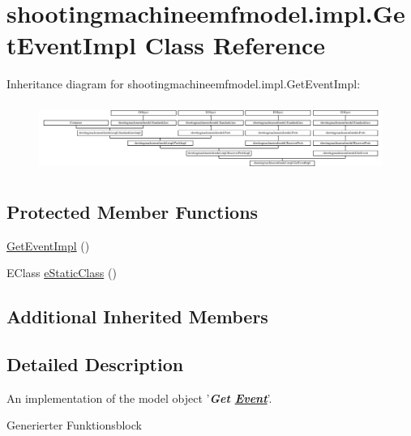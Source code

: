 \hypertarget{classshootingmachineemfmodel_1_1impl_1_1_get_event_impl}{\section{shootingmachineemfmodel.\-impl.\-Get\-Event\-Impl Class Reference}
\label{classshootingmachineemfmodel_1_1impl_1_1_get_event_impl}
}
Inheritance diagram for shootingmachineemfmodel.\-impl.\-Get\-Event\-Impl\-:\begin{figure}[H]
\begin{center}
\leavevmode
\includegraphics[height=2.247492cm]{classshootingmachineemfmodel_1_1impl_1_1_get_event_impl}
\end{center}
\end{figure}
\subsection*{Protected Member Functions}
\begin{DoxyCompactItemize}
\item 
\hyperlink{classshootingmachineemfmodel_1_1impl_1_1_get_event_impl_a4bac77b9855d24698d2247c59606b89f}{Get\-Event\-Impl} ()
\item 
E\-Class \hyperlink{classshootingmachineemfmodel_1_1impl_1_1_get_event_impl_a2c38cea631e0d873f271388337393df6}{e\-Static\-Class} ()
\end{DoxyCompactItemize}
\subsection*{Additional Inherited Members}


\subsection{Detailed Description}
An implementation of the model object '{\itshape {\bfseries Get \hyperlink{interfaceshootingmachineemfmodel_1_1_event}{Event}}}'.

Generierter Funktionsblock 

